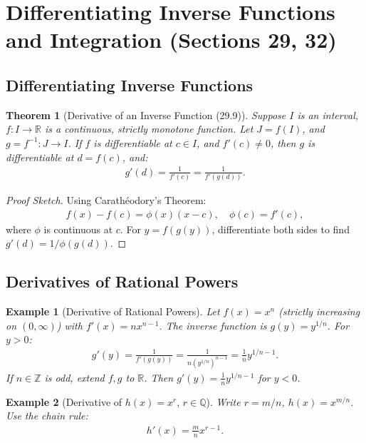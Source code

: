 \documentclass[9pt]{article}
\theoremstyle{definition}
\theoremstyle{plain}
\newtheorem{theorem}{Theorem}
\newtheorem{example}{Example}
\begin{document}
\section*{Differentiating Inverse Functions and Integration (Sections 29, 32)}

\subsection*{Differentiating Inverse Functions}
\begin{theorem}[Derivative of an Inverse Function (29.9)]
Suppose $ I $ is an interval, $ f : I \to \mathbb{R} $ is a continuous, strictly monotone function. Let $ J = f(I) $, and $ g = f^{-1} : J \to I $. If $ f $ is differentiable at $ c \in I $, and $ f'(c) \neq 0 $, then $ g $ is differentiable at $ d = f(c) $, and:
\begin{align}
g'(d) = \frac{1}{f'(c)} = \frac{1}{f'(g(d))}.
\end{align}
\end{theorem}

\begin{proof}[Proof Sketch]
Using Carathéodory’s Theorem:
\begin{align}
f(x) - f(c) = \phi(x)(x - c), \quad \phi(c) = f'(c),
\end{align}
where $ \phi $ is continuous at $ c $. For $ y = f(g(y)) $, differentiate both sides to find $ g'(d) = 1 / \phi(g(d)) $.
\end{proof}

\subsection*{Derivatives of Rational Powers}
\begin{example}[Derivative of Rational Powers]
Let $ f(x) = x^n $ (strictly increasing on $ (0, \infty) $) with $ f'(x) = nx^{n-1} $. The inverse function is $ g(y) = y^{1/n} $. For $ y > 0 $:
\begin{align}
g'(y) = \frac{1}{f'(g(y))} = \frac{1}{n(y^{1/n})^{n-1}} = \frac{1}{n} y^{1/n - 1}.
\end{align}
If $ n \in \mathbb{Z} $ is odd, extend $ f, g $ to $ \mathbb{R} $. Then $ g'(y) = \frac{1}{n} y^{1/n - 1} $ for $ y < 0 $.
\end{example}

\begin{example}[Derivative of $ h(x) = x^r $, $ r \in \mathbb{Q} $]
Write $ r = m/n $, $ h(x) = x^{m/n} $. Use the chain rule:
\begin{align}
h'(x) = \frac{m}{n} x^{r-1}.
\end{align}
\end{example}
\end{document}
